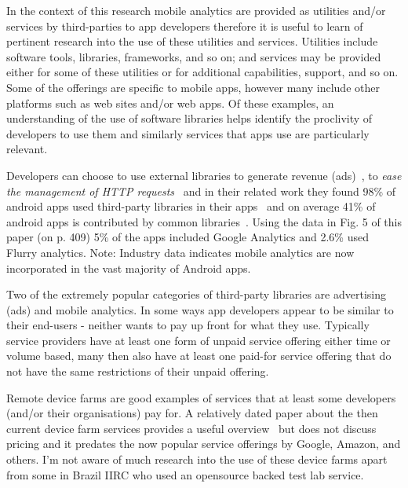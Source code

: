 In the context of this research mobile analytics are provided as utilities and/or services by third-parties to app developers therefore it is useful to learn of pertinent research into the use of these utilities and services. Utilities include software tools, libraries, frameworks, and so on; and services may be provided either for some of these utilities or for additional capabilities, support, and so on. Some of the offerings are specific to mobile apps, however many include other platforms such as web sites and/or web apps. Of these examples, an understanding of the use of software libraries helps identify the proclivity of developers to use them and similarly services that apps use are particularly relevant.


Developers can choose to use external libraries to generate revenue (ads)~, to \emph{ease the management of HTTP requests}~ and in their related work they found 98\% of android apps used third-party libraries in their apps~ and on average 41\% of android apps is contributed by common libraries~. Using the data in Fig. 5 of this paper (on p. 409) 5\% of the apps included Google Analytics and 2.6\% used Flurry analytics. Note: Industry data indicates mobile analytics are now incorporated in the vast majority of Android apps.  

Two of the extremely popular categories of third-party libraries are advertising (ads) and mobile analytics.
In some ways app developers appear to be similar to their end-users - neither wants to pay up front for what they use. Typically service providers have at least one form of unpaid service offering either time or volume based, many then also have at least one paid-for service offering that do not have the same restrictions of their unpaid offering.

Remote device farms are good examples of services that at least some developers (and/or their organisations) pay for. A relatively dated paper about the then current device farm services provides a useful overview~ but does not discuss pricing and it predates the now popular service offerings by Google, Amazon, and others. I'm not aware of much research into the use of these device farms apart from some in Brazil IIRC who used an opensource backed test lab service. 


